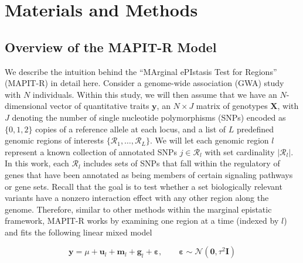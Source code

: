 \documentclass[10pt,a4paper]{article}
\newcommand{\bg}{\mathbf{g}}
\newcommand{\by}{\mathbf{y}}
\newcommand{\bu}{\mathbf{u}}
\newcommand{\bfm}{\mathbf{m}}
\newcommand{\bX}{\mathbf{X}}
\newcommand{\bI}{\mathbf{I}}
\newcommand{\N}{\mathcal{N}}
\newcommand{\bvarepsilon}{\boldsymbol\varepsilon}
\begin{document}
\section*{Materials and Methods} 

\subsection*{Overview of the MAPIT-R Model}

We describe the intuition behind the ``MArginal ePIstasis Test for Regions'' (MAPIT-R) in detail here. Consider a genome-wide association (GWA) study with $N$ individuals. Within this study, we will then assume that we have an $N$-dimensional vector of quantitative traits $\by$, an $N\times J$ matrix of genotypes $\bX$, with $J$ denoting the number of single nucleotide polymorphisms (SNPs) encoded as $\{0,1,2\}$ copies of a reference allele at each locus, and a list of $L$ predefined genomic regions of interests $\{\mathcal{R}_1,\ldots,\mathcal{R}_L\}$. We will let each genomic region $l$ represent a known collection of annotated SNPs $j\in\mathcal{R}_l$ with set cardinality $|\mathcal{R}_l|$. In this work, each $\mathcal{R}_l$ includes sets of SNPs that fall within the regulatory of genes that have been annotated as being members of certain signaling pathways or gene sets. Recall that the goal is to test whether a set biologically relevant variants have a nonzero interaction effect with any other region along the genome. Therefore, similar to other methods within the marginal epistatic framework, MAPIT-R works by examining one region at a time (indexed by $l$) and fits the following linear mixed model
\begin{linenomath*}
\begin{equation}
\by = \mu + \bu_l + \bfm_l + \bg_l +\bvarepsilon, \quad\quad \bvarepsilon\sim\N(\bm{0},\tau^2\bI)\label{mapit_r}
\end{equation}
\end{linenomath*}
\end{document}
